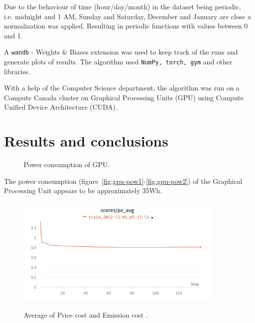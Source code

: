 \documentclass{article}
\numberwithin{equation}{subsection}
\begin{document}
Due to the behaviour of time (hour/day/month) in the dataset being periodic, i.e. midnight and 1 AM, Sunday and Saturday, December and January are close a normalization was applied. Resulting in periodic functions with values between 0 and 1.

A \verb!wandb! - Weights \& Biases extension was used to keep track of the runs and generate plots of results. The algorithm used \verb!NumPy, torch, gym! and other libraries.

With a help of the Computer Science department\cite{gitlab}, the algorithm was run on a Compute Canada cluster on Graphical Processing Units (GPU) using Compute Unified Device Architecture (CUDA). 



\section{Results and conclusions}
	
	\begin{figure}[H]
		\centering	
		\caption{Power consumption of GPU.}
	\end{figure}
		
The power consumption (figure~\ref{fig:gpu-pow1}-\ref{fig:gpu-pow2}) of the Graphical Processing Unit appears to be approximately 35Wh.

	\begin{figure}[H]
	{\centering
	  {\includegraphics[width = 0.9\textwidth]{peAvgGPU}
	  }
	  \par}
	\caption{Average of Price cost and Emission cost .}
	\label{fig:pe-avg}
	\end{figure}
	
\end{document}
